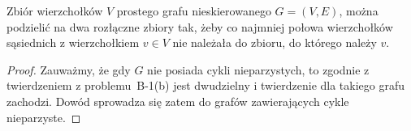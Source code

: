 \subexercise{} %
\begin{twierdzenie}
	Zbiór wierzchołków $V$ prostego grafu nieskierowanego $G=(V,E)$, można podzielić na dwa rozłączne zbiory tak, żeby co najmniej połowa wierzchołków sąsiednich z wierzchołkiem $v\in V$ nie należała do zbioru, do którego należy $v$.
\end{twierdzenie}
\begin{proof}
Zauważmy, że gdy $G$ nie posiada cykli nieparzystych, to zgodnie z twierdzeniem z problemu~B-1(b) jest dwudzielny i twierdzenie dla takiego grafu zachodzi. Dowód sprowadza się zatem do grafów zawierających cykle nieparzyste.


\end{proof}

